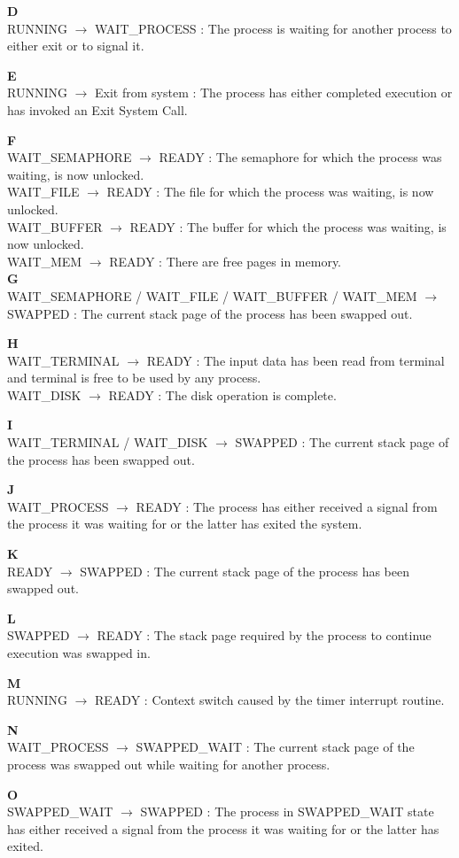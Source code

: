 \textbf{D}\\
RUNNING $\rightarrow$ WAIT\_PROCESS : The process is waiting for another process to either exit or to signal it.

\textbf{E}\\
RUNNING $\rightarrow$ Exit from system : The process has either completed execution or has invoked an Exit System Call.

\textbf{F}\\
WAIT\_SEMAPHORE $\rightarrow$ READY : The semaphore for which the process was waiting, is now unlocked.\\
WAIT\_FILE $\rightarrow$ READY : The file for which the process was waiting, is now unlocked.\\
WAIT\_BUFFER $\rightarrow$ READY : The buffer for which the process was waiting, is now unlocked.\\
WAIT\_MEM $\rightarrow$ READY : There are free pages in memory.\\

\textbf{G}\\
WAIT\_SEMAPHORE / WAIT\_FILE / WAIT\_BUFFER / WAIT\_MEM $\rightarrow$ SWAPPED : The current stack page of the process has been swapped out.

\textbf{H}\\
WAIT\_TERMINAL $\rightarrow$ READY : The input data has been read from terminal and terminal is free to be used by any process.\\
WAIT\_DISK $\rightarrow$ READY : The disk operation is complete.


\textbf{I}\\
WAIT\_TERMINAL / WAIT\_DISK $\rightarrow$ SWAPPED : The current stack page of the process has been swapped out.

\textbf{J}\\
WAIT\_PROCESS $\rightarrow$ READY : The process has either received a signal from the process it was waiting for or the latter has exited the system.

\textbf{K}\\
READY $\rightarrow$ SWAPPED : The current stack page of the process has been swapped out.

\textbf{L}\\
SWAPPED $\rightarrow$ READY : The stack page required by the process to continue execution was swapped in.

\textbf{M}\\
RUNNING $\rightarrow$ READY : Context switch caused by the timer interrupt routine.

\textbf{N}\\
WAIT\_PROCESS $\rightarrow$ SWAPPED\_WAIT : The current stack page of the process was swapped out while waiting for another process.

\textbf{O}\\
SWAPPED\_WAIT $\rightarrow$ SWAPPED : The process in SWAPPED\_WAIT state has either received a signal from the process it was waiting for or the latter has exited.


